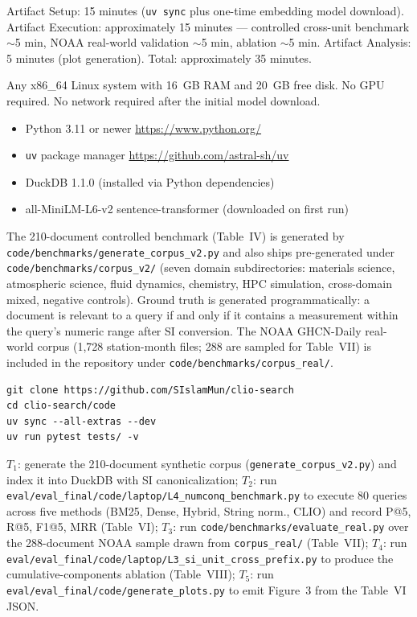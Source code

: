 \documentclass[conference]{IEEEtran}
\begin{document}
Artifact Setup: 15 minutes (\texttt{uv sync} plus one-time embedding model download).
Artifact Execution: approximately 15 minutes --- controlled cross-unit benchmark $\sim$5 min, NOAA real-world validation $\sim$5 min, ablation $\sim$5 min.
Artifact Analysis: 5 minutes (plot generation).
Total: approximately 35 minutes.

\artin


Any x86\_64 Linux system with 16~GB RAM and 20~GB free disk. No GPU required. No network required after the initial model download.


\begin{itemize}
\item Python 3.11 or newer \url{https://www.python.org/}
\item \texttt{uv} package manager \url{https://github.com/astral-sh/uv}
\item DuckDB 1.1.0 (installed via Python dependencies)
\item all-MiniLM-L6-v2 sentence-transformer (downloaded on first run)
\end{itemize}


The 210-document controlled benchmark (Table~IV) is generated by \texttt{code/benchmarks/generate\_corpus\_v2.py} and also ships pre-generated under \texttt{code/benchmarks/corpus\_v2/} (seven domain subdirectories: materials science, atmospheric science, fluid dynamics, chemistry, HPC simulation, cross-domain mixed, negative controls). Ground truth is generated programmatically: a document is relevant to a query if and only if it contains a measurement within the query's numeric range after SI conversion. The NOAA GHCN-Daily real-world corpus (1{,}728 station-month files; 288 are sampled for Table~VII) is included in the repository under \texttt{code/benchmarks/corpus\_real/}.


\begin{verbatim}
git clone https://github.com/SIslamMun/clio-search
cd clio-search/code
uv sync --all-extras --dev
uv run pytest tests/ -v
\end{verbatim}

\artcomp

$T_1$: generate the 210-document synthetic corpus (\texttt{generate\_corpus\_v2.py}) and index it into DuckDB with SI canonicalization;
$T_2$: run \texttt{eval/eval\_final/code/laptop/L4\_numconq\_benchmark.py} to execute 80 queries across five methods (BM25, Dense, Hybrid, String norm., CLIO) and record P@5, R@5, F1@5, MRR (Table~VI);
$T_3$: run \texttt{code/benchmarks/evaluate\_real.py} over the 288-document NOAA sample drawn from \texttt{corpus\_real/} (Table~VII);
$T_4$: run \texttt{eval/eval\_final/code/laptop/L3\_si\_unit\_cross\_prefix.py} to produce the cumulative-components ablation (Table~VIII);
$T_5$: run \texttt{eval/eval\_final/code/generate\_plots.py} to emit Figure~3 from the Table~VI JSON.
\end{document}
